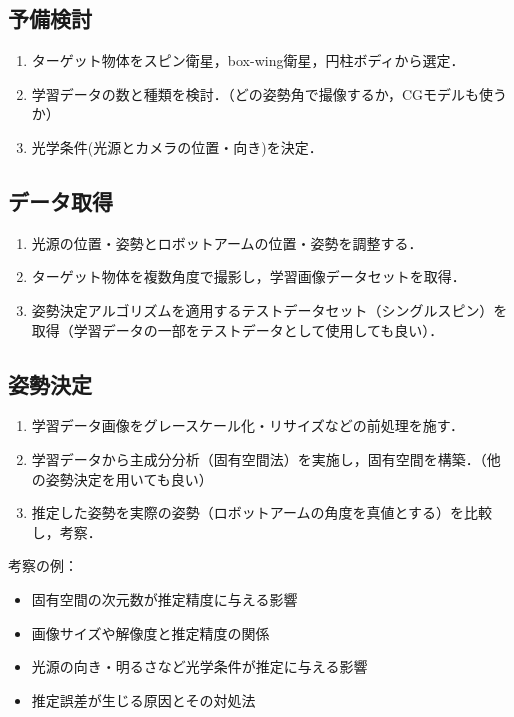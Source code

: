 \documentclass{article}
\begin{document}
\subsection{予備検討}
\begin{enumerate}
\item ターゲット物体をスピン衛星，box-wing衛星，円柱ボディから選定．
\item 学習データの数と種類を検討．（どの姿勢角で撮像するか，CGモデルも使うか）
\item 光学条件(光源とカメラの位置・向き)を決定．
\end{enumerate}

\subsection{データ取得}
\begin{enumerate}
\item 光源の位置・姿勢とロボットアームの位置・姿勢を調整する．
\item ターゲット物体を複数角度で撮影し，学習画像データセットを取得．
\item 姿勢決定アルゴリズムを適用するテストデータセット（シングルスピン）を取得（学習データの一部をテストデータとして使用しても良い）．
\end{enumerate}

\subsection{姿勢決定}
\begin{enumerate}
\item 学習データ画像をグレースケール化・リサイズなどの前処理を施す．
\item 学習データから主成分分析（固有空間法）を実施し，固有空間を構築．（他の姿勢決定を用いても良い）
\item 推定した姿勢を実際の姿勢（ロボットアームの角度を真値とする）を比較し，考察．
\end{enumerate}

考察の例：
\begin{itemize}
\item 固有空間の次元数が推定精度に与える影響
\item 画像サイズや解像度と推定精度の関係
\item 光源の向き・明るさなど光学条件が推定に与える影響
\item 推定誤差が生じる原因とその対処法
\end{itemize}
\end{document}
